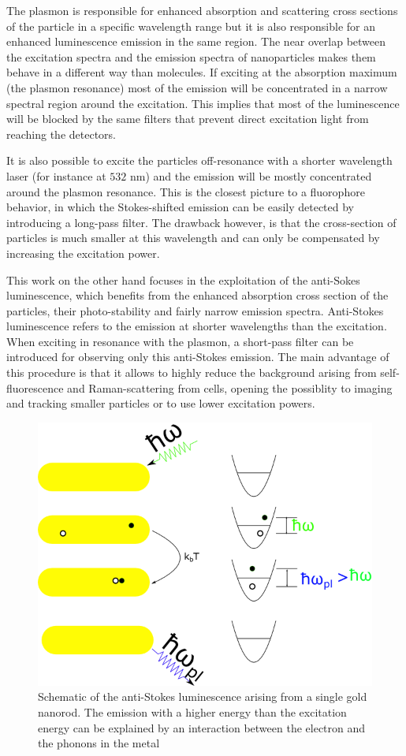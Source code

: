 \documentclass[journal=nalefd,manuscript=letter]{achemso}
\newcommand{\nm}{\ensuremath{\,\textrm{nm}}}
\begin{document}
The plasmon is responsible for enhanced absorption and scattering cross sections
of the particle in a specific wavelength range but it is also responsible for an
enhanced luminescence emission in the same region. The near overlap between the
excitation spectra and the emission spectra of nanoparticles makes them behave
in a different way than molecules. If exciting at the absorption maximum (the
plasmon resonance) most of the emission will be concentrated in a narrow
spectral region around the excitation. This implies that most of the
luminescence will be blocked by the same filters that prevent direct excitation
light from reaching the detectors.

It is also possible to excite the particles off-resonance with a
shorter wavelength laser (for instance at $532\,\nm$) and the emission will be
mostly concentrated around the plasmon resonance. This is the closest picture
to a fluorophore behavior, in which the Stokes-shifted emission can be easily
detected by introducing a long-pass filter. The drawback however, is that the
cross-section of particles is much smaller at this wavelength and can only
be compensated by increasing the excitation power. 

This work on the other hand focuses in the exploitation of the anti-Sokes
luminescence, which benefits from the enhanced absorption cross section of the
particles, their photo-stability and fairly narrow emission spectra. Anti-Stokes
luminescence refers to the emission at shorter wavelengths than the
excitation. When exciting in resonance with the plasmon, a short-pass
filter can be introduced for observing only this anti-Stokes emission. The main
advantage of this procedure is that it allows to highly reduce the background arising from
self-fluorescence and Raman-scattering from cells, opening the possiblity to
imaging and tracking smaller particles or to use lower excitation powers.

\begin{figure}[htp]
\centering
	\includegraphics[width=0.4\linewidth]{luminescence_all_AS.png}
	\caption{Schematic of the anti-Stokes luminescence arising from a single gold
	nanorod. The emission with a higher energy than the excitation energy can be
	explained by an interaction between the electron and the phonons in the metal}
	\label{fig:anti-Stokes-process}
\end{figure}
\end{document}
